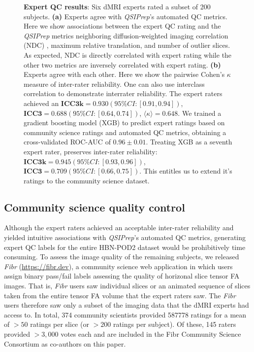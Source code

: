 \documentclass[fleqn,10pt]{wlscirep}
\begin{document}
\begin{figure}[ht]
\begin{subfigure}{.5\textwidth}
    \caption{}
    \label{fig:expert-qc:irr}
    \end{subfigure}
    \caption{%
        {\bf Expert QC results}:
        Six dMRI experts rated a subset of \num{200} subjects.
        \textbf{(a)} Experts agree with \emph{QSIPrep}'s automated QC metrics.
        Here we show associations between the expert QC rating and the
        \emph{QSIPrep} metrics neighboring diffusion-weighted imaging
        correlation (NDC) \cite{yeh2019-kb}, maximum relative translation, and
        number of outlier slices. As expected, NDC is directly correlated with expert rating while
        the other two metrics are inversely correlated with expert rating.
        \textbf{(b)} Experts agree with each other. Here we show the pairwise
        Cohen's $\kappa$ measure of inter-rater reliability.  One can also use
        interclass correlation to demonstrate interrater reliability. The expert
        raters achieved an $\textbf{ICC3k} = 0.930 (95\% CI: [0.91, 0.94])$,
        $\textbf{ICC3} = 0.688 (95\% CI: [0.64, 0.74])$, $\langle \kappa \rangle
        = 0.648$.  We trained a gradient boosting model (XGB) to predict expert
        ratings based on community science ratings and automated QC metrics,
        obtaining a cross-validated ROC-AUC of $0.96 \pm 0.01$. Treating
        XGB as a seventh expert rater, preserves inter-rater reliability:
        $\textbf{ICC3k} = 0.945 (95\% CI: [0.93, 0.96])$, $\textbf{ICC3} = 0.709
        (95\% CI: [0.66, 0.75])$.  This entitles us to extend it's ratings to
        the community science dataset.
    }
    \label{fig:expert-qc}
\end{figure}

\subsection*{Community science quality control}

Although the expert raters achieved an acceptable inter-rater reliability and
yielded intuitive associations with \emph{QSIPrep}'s automated QC metrics,
generating expert QC labels for the entire HBN-POD2 dataset would be
prohibitively time consuming. To assess the image quality of the remaining
subjects, we released \emph{Fibr} (\url{https://fibr.dev}), a community science
web application in which users assign binary pass/fail labels assessing the
quality of horizonal slice tensor FA images. That is, \emph{Fibr} users saw
individual slices or an animated sequence of slices taken from the entire tensor
FA volume that the expert raters saw. The \emph{Fibr} users therefore saw only a
subset of the imaging data that the dMRI experts had access to. In total,
\num{374} community scientists provided \num{587778} ratings for a mean of $>50$
ratings per slice (or $>200$ ratings per subject). Of these, \num{145} raters
provided $>3,000$ votes each and are included in the Fibr Community Science
Consortium as co-authors on this paper.
\end{document}
